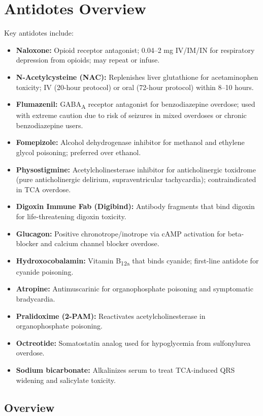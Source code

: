 \chapter{Antidotes Overview}
\label{sec:Antidotes Overview}
Key antidotes include:
\begin{itemize}[noitemsep]
  \item \textbf{Naloxone:} Opioid receptor antagonist; 0.04--2 mg IV/IM/IN for respiratory depression from opioids; may repeat or infuse.
  \item \textbf{N-Acetylcysteine (NAC):} Replenishes liver glutathione for acetaminophen toxicity; IV (20-hour protocol) or oral (72-hour protocol) within 8--10 hours.
  \item \textbf{Flumazenil:} GABA\textsubscript{A} receptor antagonist for benzodiazepine overdose; used with extreme caution due to risk of seizures in mixed overdoses or chronic benzodiazepine users.
  \item \textbf{Fomepizole:} Alcohol dehydrogenase inhibitor for methanol and ethylene glycol poisoning; preferred over ethanol.
  \item \textbf{Physostigmine:} Acetylcholinesterase inhibitor for anticholinergic toxidrome (pure anticholinergic delirium, supraventricular tachycardia); contraindicated in TCA overdose.
  \item \textbf{Digoxin Immune Fab (Digibind):} Antibody fragments that bind digoxin for life-threatening digoxin toxicity.
  \item \textbf{Glucagon:} Positive chronotrope/inotrope via cAMP activation for beta-blocker and calcium channel blocker overdose.
  \item \textbf{Hydroxocobalamin:} Vitamin B\textsubscript{12a} that binds cyanide; first-line antidote for cyanide poisoning.
  \item \textbf{Atropine:} Antimuscarinic for organophosphate poisoning and symptomatic bradycardia.
  \item \textbf{Pralidoxime (2-PAM):} Reactivates acetylcholinesterase in organophosphate poisoning.
  \item \textbf{Octreotide:} Somatostatin analog used for hypoglycemia from sulfonylurea overdose.
  \item \textbf{Sodium bicarbonate:} Alkalinizes serum to treat TCA-induced QRS widening and salicylate toxicity.
\end{itemize}

\section{Overview}

